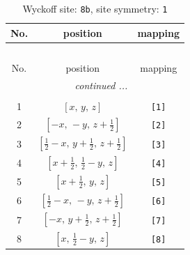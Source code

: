 \documentclass[fleqn,8pt]{jsarticle}
\begin{document}
\begin{longtable}{ccc}
\caption{Wyckoff site: {\tt 8b}, site symmetry: {\tt 1}}
 \\
 \hline \hline
No. & position & mapping \\ \hline \endfirsthead

\multicolumn{2}{l}{\tablename\ \thetable{}} \\
 \hline \hline
No. & position & mapping \\ \hline \endhead

 \hline \hline
\multicolumn{2}{r}{\footnotesize\it continued ...} \\ \endfoot

 \hline \hline
\multicolumn{2}{r}{} \\ \endlastfoot

1 & $\left[ x,\, y,\, z \right]$ & {\tt [1]} \\ \hline
2 & $\left[ - x,\, - y,\, z + \frac{1}{2} \right]$ & {\tt [2]} \\ \hline
3 & $\left[ \frac{1}{2} - x,\, y + \frac{1}{2},\, z + \frac{1}{2} \right]$ & {\tt [3]} \\ \hline
4 & $\left[ x + \frac{1}{2},\, \frac{1}{2} - y,\, z \right]$ & {\tt [4]} \\ \hline
5 & $\left[ x + \frac{1}{2},\, y,\, z \right]$ & {\tt [5]} \\ \hline
6 & $\left[ \frac{1}{2} - x,\, - y,\, z + \frac{1}{2} \right]$ & {\tt [6]} \\ \hline
7 & $\left[ - x,\, y + \frac{1}{2},\, z + \frac{1}{2} \right]$ & {\tt [7]} \\ \hline
8 & $\left[ x,\, \frac{1}{2} - y,\, z \right]$ & {\tt [8]} \\
\end{longtable}
\end{document}
